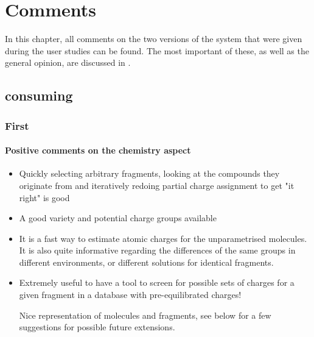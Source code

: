 \chapter{Comments}

In this chapter, all comments on the two versions of the system that were given during the user studies can be found. The most important of these, as well as the general opinion, are discussed in .

\section{\oframp{} consuming}
\subsection{First}
\subsubsection{Positive comments on the chemistry aspect}
\begin{itemize}
\item Quickly selecting arbitrary fragments, looking at the compounds they originate from and iteratively redoing partial charge assignment to get "it right" is good

\item A good variety and potential charge groups available

\item It is a fast way to estimate atomic charges for the unparametrised molecules. It is also quite informative regarding the differences of the same groups in different environments, or different solutions for identical fragments.

\item Extremely useful to have a tool to screen for possible sets of charges for a given fragment in a database with pre-equilibrated charges!

Nice representation of molecules and fragments, see below for a few suggestions for possible future extensions.

\end{itemize}


